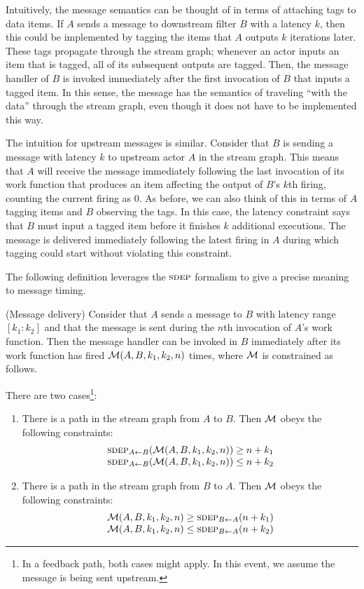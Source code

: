 Intuitively, the message semantics can be thought of in terms of
attaching tags to data items.  If $A$ sends a message to downstream
filter $B$ with a latency $k$, then this could be implemented by
tagging the items that $A$ outputs $k$ iterations later.  These tags
propagate through the stream graph; whenever an actor inputs an item
that is tagged, all of its subsequent outputs are tagged.  Then, the
message handler of $B$ is invoked immediately after the first
invocation of $B$ that inputs a tagged item.  In this sense, the
message has the semantics of traveling ``with the data'' through the
stream graph, even though it does not have to be implemented this way.

The intuition for upstream messages is similar.  Consider that $B$ is
sending a message with latency $k$ to upstream actor $A$ in the stream
graph.  This means that $A$ will receive the message immediately
following the last invocation of its work function that produces an
item affecting the output of $B$'s $k$th firing, counting the current
firing as 0.  As before, we can also think of this in terms of $A$
tagging items and $B$ observing the tags.  In this case, the latency
constraint says that $B$ must input a tagged item before it finishes
$k$ additional executions.  The message is delivered immediately
following the latest firing in $A$ during which tagging could start
without violating this constraint.

The following definition leverages the $\textsc{sdep}$ formalism to give a
precise meaning to message timing.

\begin{definition}(Message delivery)
Consider that $A$ sends a message to $B$ with latency range
$[k_1:k_2]$ and that the message is sent during the $n$th invocation
of $A$'s work function.  Then the message handler can be invoked in
$B$ immediately after its work function has fired ${\cal M}(A, B, k_1,
k_2, n)$ times, where ${\cal M}$ is constrained as follows.

There are two cases\footnote{In a feedback path, both cases might apply.  In this event, we assume the message is being sent upstream.}:
\begin{enumerate}

\item There is a path in the stream graph from $A$ to $B$.  Then
${\cal M}$ obeys the following constraints:
\[
\begin{array}{l}
\sdepf{A}{B}({\cal M}(A, B, k_1, k_2, n)) \ge n+k_1\\
\sdepf{A}{B}({\cal M}(A, B, k_1, k_2, n)) \le n+k_2
\end{array}
\]

\item There is a path in the stream graph from $B$ to $A$.  Then
${\cal M}$ obeys the following constraints:
\[
\begin{array}{l}
{\cal M}(A, B, k_1, k_2, n) \ge \sdepf{B}{A}(n + k_1)\\
{\cal M}(A, B, k_1, k_2, n) \le \sdepf{B}{A}(n + k_2)
\end{array}
\]
\end{enumerate}
\end{definition}

